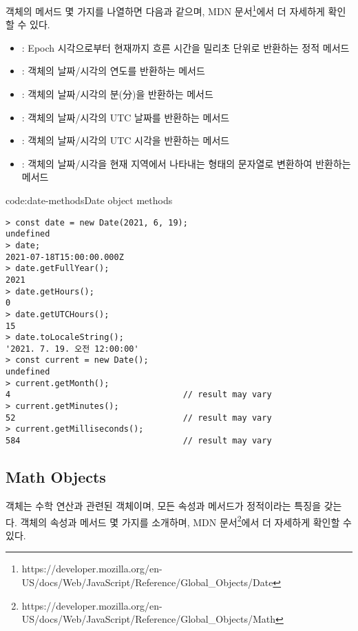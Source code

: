  객체의 메서드 몇 가지를 나열하면 다음과 같으며, MDN 문서\footnote{https://developer.mozilla.org/en-US/docs/Web/JavaScript/Reference/Global\_Objects/Date}에서 더 자세하게 확인할 수 있다.

\begin{itemize}
    \item {}: Epoch 시각으로부터 현재까지 흐른 시간을 밀리초 단위로 반환하는 정적 메서드
    \item {}:  객체의 날짜/시각의 연도를 반환하는 메서드
    \item {}:  객체의 날짜/시각의 분(分)을 반환하는 메서드
    \item {}:  객체의 날짜/시각의 UTC 날짜를 반환하는 메서드
    \item {}:  객체의 날짜/시각의 UTC 시각을 반환하는 메서드
    \item {}:  객체의 날짜/시각을 현재 지역에서 나타내는 형태의 문자열로 변환하여 반환하는 메서드
\end{itemize}

\begin{codeenv}{code:date-methods}{Date object methods}\begin{verbatim}
> const date = new Date(2021, 6, 19);
undefined
> date;
2021-07-18T15:00:00.000Z
> date.getFullYear();
2021
> date.getHours();
0
> date.getUTCHours();
15
> date.toLocaleString();
'2021. 7. 19. 오전 12:00:00'
> const current = new Date();
undefined
> current.getMonth();
4                                   // result may vary
> current.getMinutes();
52                                  // result may vary
> current.getMilliseconds();
584                                 // result may vary
\end{verbatim}
\end{codeenv}


\subsection*{Math Objects}

 객체는 수학 연산과 관련된 객체이며, 모든 속성과 메서드가 정적이라는 특징을 갖는다.  객체의 속성과 메서드 몇 가지를 소개하며, MDN 문서\footnote{https://developer.mozilla.org/en-US/docs/Web/JavaScript/Reference/Global\_Objects/Math}에서 더 자세하게 확인할 수 있다.

